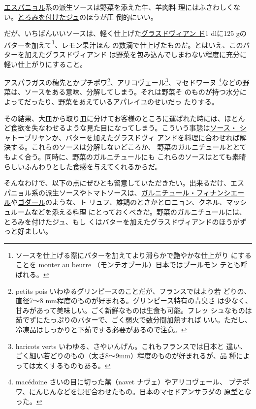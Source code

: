 \vspace{1\zw}

\protect\hyperlink{sauce-espagnole}{エスパニョル}系の派生ソースは野菜を添えた牛、羊肉料
理にはふさわしくない。\protect\hyperlink{jus-de-veau-lie}{とろみを付けたジュ}のほうが圧
倒的にいい。

だが、いちばんいいソースは、軽く仕上げた\protect\hyperlink{glace-de-viande}{グラスドヴィアン
ド}1 dlに125 gのバターを加えて\footnote{ソースを仕上げる際にバターを加えてより滑らかで艶やかな仕上がり
  にすることを monter au beurre （モンテオブール）日本ではブールモン
  テとも呼ばれる。}、レモン果汁ほん
の数滴で仕上げたものだ。とはいえ、このバターを加えたグラスドヴィアンド
は野菜を包み込んでしまわない程度に充分に軽い仕上がりにすること。

アスパラガスの穂先とかプチポワ\footnote{petits pois
  いわゆるグリンピースのことだが、フランスではより若 どりの、直径7〜8
  mm程度のものが好まれる。グリンピース特有の青臭さ
  は少なく、甘みがあって美味しい。ごく新鮮なものは生食も可能。フレッ
  シュなものは茹でずにたっぷりのバターで、ごく弱火で数分間加熱すれば
  いい。ただし、冷凍品はしっかりと下茹でする必要があるので注意。}、アリコヴェール\footnote{haricots
  verts いわゆる、さやいんげん。これもフランスでは日本と
  違い、ごく細い若どりのもの（太さ8〜9mm）程度のものが好まれるが、品
  種によっては太くするものもある。}、マセドワーヌ \footnote{macédoine
  さいの目に切った蕪（navet ナヴェ）やアリコヴェール、
  プチポワ、にんじんなどを混ぜ合わせたもの。日本のマセドアンサラダの
  原型となった。}などの野菜は、ソースをある意味、分解してしまう。それは野菜そ
のものが持つ水分によってだったり、野菜をあえているアパレイユのせいだっ
たりする。

その結果、大皿から取り皿に分けてお客様のところに運ばれた時には、ほとん
ど食欲を失なわせるような見た目になってしまう。こういう事態は\protect\hyperlink{sauce-chateaubriand}{ソース・
シャトーブリヤン}か、バターを加えたグラスドヴィ
アンドを料理に合わせれば解決する。これらのソースは分解しないどころか、
野菜のガルニチュールととてもよく合う。同時に、野菜のガルニチュールにも
これらのソースはとても素晴らしいふんわりとした食感を与えてくれるからだ。

そんなわけで、以下の点にぜひとも留意していただきたい。出来るだけ、エス
パニョル系の派生ソースやトマトソースは、\protect\hyperlink{garniture-financiere}{ガルニチュール・フィナンシエー
ル}や\protect\hyperlink{garniture-godard}{ゴダール}のような、ト
リュフ、雄鶏のとさかとロニョン、クネル、マッシュルームなどを添える料理
にとっておくべきだ。野菜のガルニチュールには、とろみを付けたジュ、もし
くはバターを加えたグラスドヴィアンドのほうがずっと好ましい。
